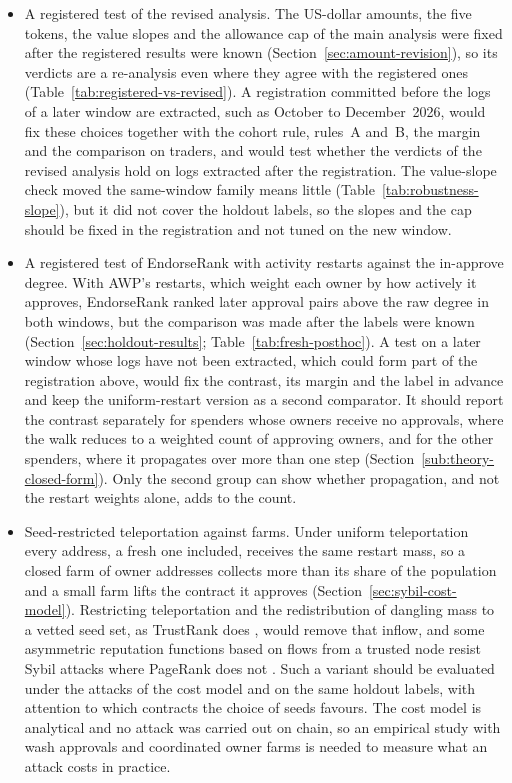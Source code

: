 \begin{itemize}
\item A registered test of the revised analysis. The US-dollar amounts, the five tokens, the value slopes and the allowance cap of the main analysis were fixed after the registered results were known (Section~\ref{sec:amount-revision}), so its verdicts are a re-analysis even where they agree with the registered ones (Table~\ref{tab:registered-vs-revised}). A registration committed before the logs of a later window are extracted, such as October to December~2026, would fix these choices together with the cohort rule, rules~A and~B, the margin and the comparison on traders, and would test whether the verdicts of the revised analysis hold on logs extracted after the registration. The value-slope check moved the same-window family means little (Table~\ref{tab:robustness-slope}), but it did not cover the holdout labels, so the slopes and the cap should be fixed in the registration and not tuned on the new window.
\item A registered test of EndorseRank with activity restarts against the in-approve degree. With AWP's restarts, which weight each owner by how actively it approves, EndorseRank ranked later approval pairs above the raw degree in both windows, but the comparison was made after the labels were known (Section~\ref{sec:holdout-results}; Table~\ref{tab:fresh-posthoc}). A test on a later window whose logs have not been extracted, which could form part of the registration above, would fix the contrast, its margin and the label in advance and keep the uniform-restart version as a second comparator. It should report the contrast separately for spenders whose owners receive no approvals, where the walk reduces to a weighted count of approving owners, and for the other spenders, where it propagates over more than one step (Section~\ref{sub:theory-closed-form}). Only the second group can show whether propagation, and not the restart weights alone, adds to the count.
\item Seed-restricted teleportation against farms. Under uniform teleportation every address, a fresh one included, receives the same restart mass, so a closed farm of owner addresses collects more than its share of the population and a small farm lifts the contract it approves (Section~\ref{sec:sybil-cost-model}). Restricting teleportation and the redistribution of dangling mass to a vetted seed set, as TrustRank does \parencite{gyongyi2004trustrank}, would remove that inflow, and some asymmetric reputation functions based on flows from a trusted node resist Sybil attacks where PageRank does not \parencite{cheng2005sybilproof}. Such a variant should be evaluated under the attacks of the cost model and on the same holdout labels, with attention to which contracts the choice of seeds favours. The cost model is analytical and no attack was carried out on chain, so an empirical study with wash approvals and coordinated owner farms is needed to measure what an attack costs in practice.

\end{itemize}
